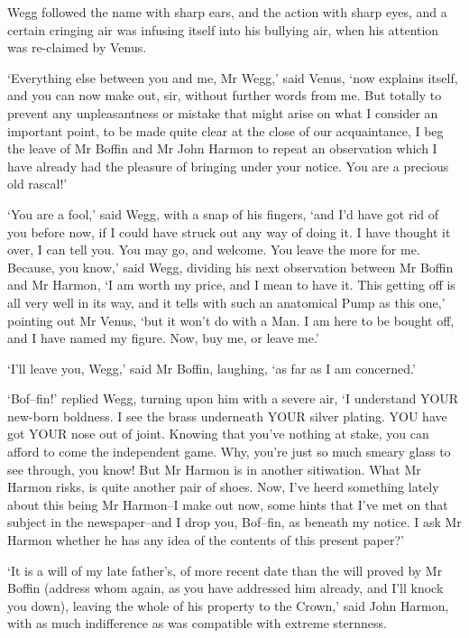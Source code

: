 Wegg followed the name with sharp ears, and the action with sharp eyes,
and a certain cringing air was infusing itself into his bullying air,
when his attention was re-claimed by Venus.

‘Everything else between you and me, Mr Wegg,’ said Venus, ‘now explains
itself, and you can now make out, sir, without further words from me.
But totally to prevent any unpleasantness or mistake that might arise on
what I consider an important point, to be made quite clear at the close
of our acquaintance, I beg the leave of Mr Boffin and Mr John Harmon to
repeat an observation which I have already had the pleasure of bringing
under your notice. You are a precious old rascal!’

‘You are a fool,’ said Wegg, with a snap of his fingers, ‘and I’d have
got rid of you before now, if I could have struck out any way of doing
it. I have thought it over, I can tell you. You may go, and welcome. You
leave the more for me. Because, you know,’ said Wegg, dividing his next
observation between Mr Boffin and Mr Harmon, ‘I am worth my price, and
I mean to have it. This getting off is all very well in its way, and it
tells with such an anatomical Pump as this one,’ pointing out Mr Venus,
‘but it won’t do with a Man. I am here to be bought off, and I have
named my figure. Now, buy me, or leave me.’

‘I’ll leave you, Wegg,’ said Mr Boffin, laughing, ‘as far as I am
concerned.’

‘Bof--fin!’ replied Wegg, turning upon him with a severe air, ‘I
understand YOUR new-born boldness. I see the brass underneath YOUR
silver plating. YOU have got YOUR nose out of joint. Knowing that you’ve
nothing at stake, you can afford to come the independent game. Why,
you’re just so much smeary glass to see through, you know! But Mr Harmon
is in another sitiwation. What Mr Harmon risks, is quite another pair
of shoes. Now, I’ve heerd something lately about this being Mr
Harmon--I make out now, some hints that I’ve met on that subject in
the newspaper--and I drop you, Bof--fin, as beneath my notice. I ask Mr
Harmon whether he has any idea of the contents of this present paper?’

‘It is a will of my late father’s, of more recent date than the will
proved by Mr Boffin (address whom again, as you have addressed him
already, and I’ll knock you down), leaving the whole of his property
to the Crown,’ said John Harmon, with as much indifference as was
compatible with extreme sternness.

